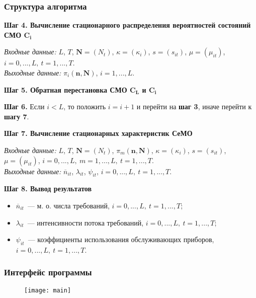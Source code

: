 
\begin{frame} \frametitle{Структура алгоритма}

\textbf{Шаг 4. Вычисление стационарного распределения вероятностей состояний СМО $\boldsymbol{C_i}$}

\emph{Входные данные:} $L$, $T$, $\mathbf{N}=(N_t)$, $\kappa=(\kappa_i)$, $s=(s_{it})$, $\mu=(\mu_{it})$, $i=0,...,L,~t=1,...,T$.\\
\emph{Выходные данные:} $\pi_i(\mathbf{n},\mathbf{N})$, $i=1,...,L$.

\textbf{Шаг 5. Обратная перестановка СМО $\boldsymbol{C_L}$ и $\boldsymbol{C_i}$}

\textbf{Шаг 6.} Если $i < L$, то положить $i=i+1$ и перейти на \textbf{шаг 3}, иначе перейти к \textbf{шагу 7}.

\textbf{Шаг 7. Вычисление стационарных характеристик СеМО}

\emph{Входные данные:} $L$, $T$, $\mathbf{N}=(N_t)$, $\pi_m(\mathbf{n},\mathbf{N})$, $\kappa=(\kappa_i)$, $s=(s_{it})$, $\mu=(\mu_{it})$, $i=0,...,L,~m=1,...,L,~t=1,...,T$.\\
\emph{Выходные данные:} $\overline{n}_{it}$, $\lambda_{it}$, $\psi_{it}$, $i=0,...,L,~t=1,...,T$.

\textbf{Шаг 8. Вывод результатов}

\begin{itemize}
\item $\overline{n}_{it}$~--- м. о. числа требований, $i=0,...,L,~t=1,...,T$;
\item $\lambda_{it}$~--- интенсивности потока требований, $i=0,...,L,~t=1,...,T$;
\item $\psi_{it}$~--- коэффициенты использования обслуживающих приборов, $i=0,...,L,~t=1,...,T$.
\end{itemize}
\end{frame}


\begin{frame} \frametitle{Интерфейс программы}
\begin{figure}[H]
  \centering
  \texttt{[image: main]}
  \label{fig:main}
\end{figure}
\end{frame}


